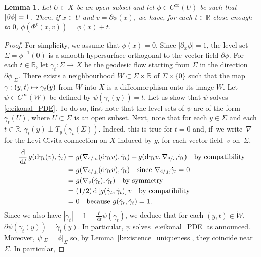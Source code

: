\documentclass[10pt]{amsart}
\newcommand\mto{\mathchoice{\longmapsto}{\mapsto}{\mapsto}{\mapsto}}
\newcommand{\sd}{\mathrm{d}}
\newcommand{\rd}{\,\mathrm{d}}
\theoremstyle{plain}
\newtheorem{lemma}[theorem]{Lemma}
\theoremstyle{definition}
\newcommand{\R}{\mathbb{R}}
\begin{document}
\begin{appendix}
\begin{lemma}\label{l:description_eikonal}
Let $U\subset X$ be an open subset and let $\phi\in C^\infty(U)$ be such that $|\partial\phi|=\nobreak1$. Then, if $x\in U$ and $v=\partial\phi(x)$, we have, for each $t\in \R$ close enough to $0$, $\phi(\Phi^t(x,v))=\phi(x)+t$.
\end{lemma}

\begin{proof}
For simplicity, we assume that $\phi(x)=0$. Since $|\partial_x\phi|=1$, the level set $\Sigma=\phi^{-1}(0)$ is a smooth hypersurface orthogonal to the vector field $\partial\phi$. For each $t\in\R$, let $\gamma_t:\Sigma\to X$ be the geodesic flow starting from $\Sigma$ in the direction $\partial\phi|_\Sigma$. There exists a neighbourhood $\tilde{W}\subset\Sigma\times\R$ of $\Sigma\times\{0\}$ such that the map $\gamma:(y,t)\mto\gamma_t(y)$ from $W$ into $X$ is a diffeomorphism onto its image $W$. Let $\psi\in C^\infty(W)$ be defined by $\psi(\gamma_t(y))=t$. Let us show that $\psi$ solves \eqref{e:eikonal_PDE}. To do so, first note that the level sets of $\psi$ are of the form $\gamma_t(U)$, where $U\subset\Sigma$ is an open subset. Next, note that for each $y\in\Sigma$ and each $t\in\R$, $\dot{\gamma}_t(y)\perp T_y(\gamma_t(\Sigma))$. Indeed, this is true for $t=0$ and, if~we write~$\nabla$ for the Levi-Civita connection on $X$ induced by $g$, for each vector field~$v$ on~$\Sigma$,
\begin{align*}
\frac{\rd}{\rd t}\, g(\sd \gamma_t(v),\dot{\gamma}_t)&=g(\nabla_{\sfrac{\sd}{\rd t}}(\sd \gamma_t v),\dot{\gamma}_t)+g(\sd \gamma_t v,\nabla_{\sfrac{\sd}  {\rd t}}\dot{\gamma}_t)\quad\textup{by compatibility}\\
&=g(\nabla_{\sfrac{\sd}{\rd t}}(\sd \gamma_t v),\dot{\gamma}_t)\quad\textup{since }\nabla_{\sfrac{\sd}  {\rd t}}\dot{\gamma}_t=0\\
&=g(\nabla_v(\dot{\gamma}_t),\dot{\gamma}_t)\quad\textup{by symmetry}\\
&=(1/2)\rd \left[g(\dot{\gamma}_t,\dot{\gamma}_t)\right]v\quad\textup{by compatibility}\\
&=0\quad\textup{because }g(\dot{\gamma}_t,\dot{\gamma}_t)=1.
\end{align*}
Since we also have $|\dot{\gamma}_t|=1=\frac{\rd}{\rd t}\psi(\gamma_t)$, we deduce that for each $(y,t)\in\tilde{W}$, $\partial\psi(\gamma_t(y))=\dot{\gamma}_t(y)$. In particular, $\psi$ solves \eqref{e:eikonal_PDE} as announced. Moreover, $\psi|_\Sigma=\phi|_\Sigma$ so, by Lem\-ma~\ref{l:existence_uniqueness}, they coincide near $\Sigma$. In particular,

\end{proof}
\end{appendix}
\end{document}
